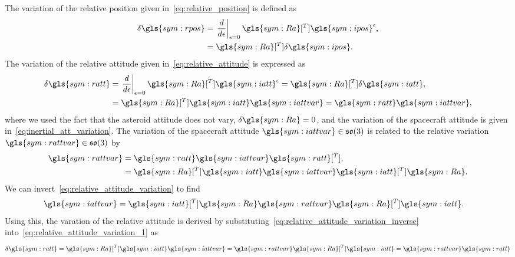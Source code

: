 The variation of the relative position given in~\cref{eq:relative_position} is defined as
\begin{align}
    \delta \gls{sym:rpos} &= \left. \diff{}{\epsilon} \right|_{\epsilon=0} \gls{sym:Ra}[^T] \gls{sym:ipos}^\epsilon ,\nonumber \\
                        &= \gls{sym:Ra}[^T] \delta \gls{sym:ipos} .\label{eq:relative_position_variation}
\end{align}
The variation of the relative attitude given in~\cref{eq:relative_attitude} is expressed as
\begin{align}
    \delta \gls{sym:ratt} &= \left. \diff{}{\epsilon} \right|_{\epsilon=0}  \gls{sym:Ra}[^T] \gls{sym:iatt}^\epsilon = \gls{sym:Ra}[^T] \delta \gls{sym:iatt}, \nonumber\\
                          &= \gls{sym:Ra}[^T] \gls{sym:iatt} \gls{sym:iattvar} = \gls{sym:ratt} \gls{sym:iattvar}, \label{eq:relative_attitude_variation_1}
\end{align}
where we used the fact that the asteroid attitude does not vary, \( \delta \gls{sym:Ra} = 0\), and the variation of the spacecraft attitude is given in~\cref{eq:inertial_att_variation}.
The variation of the spacecraft attitude \( \gls{sym:iattvar} \in \so \) is related to the relative variation \( \gls{sym:rattvar} \in \so \) by
\begin{align}
    \gls{sym:rattvar} &= \gls{sym:ratt} \gls{sym:iattvar} \gls{sym:ratt}[^T],\nonumber\\
                      &= \gls{sym:Ra}[^T] \gls{sym:iatt} \gls{sym:iattvar} \gls{sym:iatt}[^T] \gls{sym:Ra}.\label{eq:relative_attitude_variation}
\end{align}
We can invert~\cref{eq:relative_attitude_variation} to find
\begin{align}\label{eq:relative_attitude_variation_inverse}
    \gls{sym:iattvar} &= \gls{sym:iatt}[^T] \gls{sym:Ra} \gls{sym:rattvar} \gls{sym:Ra}[^T] \gls{sym:iatt}.
\end{align}
Using this, the varation of the relative attitude is derived by substituting~\cref{eq:relative_attitude_variation_inverse} into~\cref{eq:relative_attitude_variation_1} as
\begin{align}\label{eq:relative_attitude_matrix_variation}
    \delta \gls{sym:ratt} = \gls{sym:Ra}[^T] \gls{sym:iatt} \gls{sym:iattvar} = \gls{sym:rattvar} \gls{sym:Ra}[^T] \gls{sym:iatt} = \gls{sym:rattvar} \gls{sym:ratt}
\end{align}

